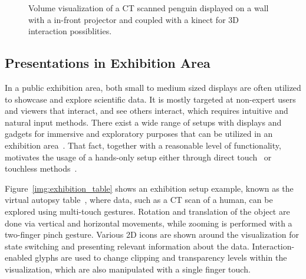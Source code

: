 \documentclass[review,journal]{vgtc}         %
\begin{document}
\begin{figure}[tb]
	\centering
	\caption{Volume visualization of a CT scanned penguin displayed on a wall with a in-front projector and coupled with a kinect for 3D interaction possiblities.}
	\label{img:exhibition_kinect}
\end{figure}

\subsection{Presentations in Exhibition Area} \label{sec:exhibition}
In a public exhibition area, both small to medium sized displays are often utilized to showcase and explore scientific data.
It is mostly targeted at non-expert users and viewers that interact, and see others interact, which requires intuitive and natural input methods.
There exist a wide range of setups with displays and gadgets for immersive and exploratory purposes that can be utilized in an exhibition area~\cite{Laha:2013:VCB:2491367.2491368, conf/egve/KruszynskiL08}.
That fact, together with a reasonable level of functionality, motivates the usage of a hands-only setup either through direct touch~\cite{Klein:2012:DSD:2322389.2322403} or touchless methods~\cite{O'hara:2013:NTP:2442106.2442111}.

Figure~\ref{img:exhibition_table} shows an exhibition setup example, known as the virtual autopsy table~\cite{LRFPY11}, where data, such as a CT scan of a human, can be explored using multi-touch gestures.
Rotation and translation of the object are done via vertical and horizontal movements, while zooming is performed with a two-finger pinch gesture.
Various 2D icons are shown around the visualization for state switching and presenting relevant information about the data.
Interaction-enabled glyphs are used to change clipping and transparency levels within the visualization, which are also manipulated with a single finger touch.
\end{document}
